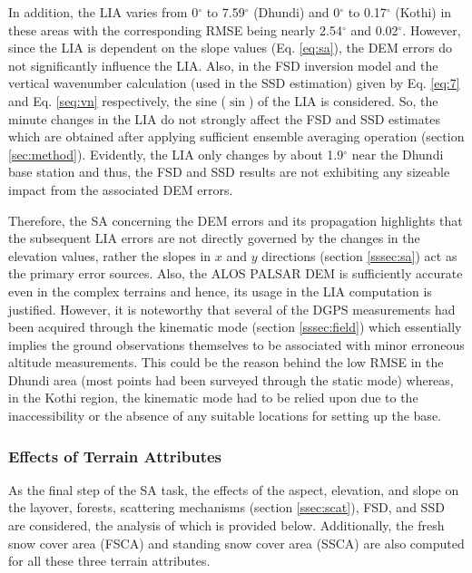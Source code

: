 \documentclass[review]{elsarticle}
\numberwithin{equation}{section}
\numberwithin{figure}{section}
\numberwithin{table}{section}
\begin{document}
In addition, the LIA varies from 0$^\circ$ to 7.59$^\circ$ (Dhundi) and 0$^\circ$ to 0.17$^\circ$ (Kothi) in these areas with the corresponding RMSE being nearly 2.54$^\circ$ and 0.02$^\circ$. However, since the LIA is dependent on the slope values (Eq. \eqref{eq:sa}), the DEM errors do not significantly influence the LIA. Also, in the FSD inversion model and the vertical wavenumber calculation (used in the SSD estimation) given by Eq. \eqref{eq:7} and Eq. \eqref{seq:vn} respectively, the sine ($\sin$) of the LIA is considered. So, the minute changes in the LIA do not strongly affect the FSD and SSD estimates which are obtained after applying sufficient ensemble averaging operation (section \ref{sec:method}). Evidently, the LIA only changes by about 1.9$^\circ$ near the Dhundi base station and thus, the FSD and SSD results are not exhibiting any sizeable impact from the associated DEM errors.

Therefore, the SA concerning the DEM errors and its propagation highlights that the subsequent LIA errors are not directly governed by the changes in the elevation values, rather the slopes in $x$ and $y$ directions (section \ref{sssec:sa}) act as the primary error sources. Also, the ALOS PALSAR DEM is sufficiently accurate even in the complex terrains and hence, its usage in the LIA computation is justified. However, it is noteworthy that several of the DGPS measurements had been acquired through the kinematic mode (section \ref{sssec:field}) which essentially implies the ground observations themselves to be associated with minor erroneous altitude measurements. This could be the reason behind the low RMSE in the Dhundi area
(most points had been surveyed through the static mode) whereas, in the Kothi region, the kinematic mode had to be relied upon due to the inaccessibility or the absence of any suitable locations for setting up the base.

\subsubsection{Effects of Terrain Attributes}
\label{sssec:terrain}

As the final step of the SA task, the effects of the aspect, elevation, and slope on the layover, forests, scattering mechanisms (section \ref{ssec:scat}), FSD, and SSD are considered, the analysis of which is provided below. Additionally, the fresh snow cover area (FSCA) and standing snow cover area (SSCA) are also computed for all these three terrain attributes.
\end{document}
